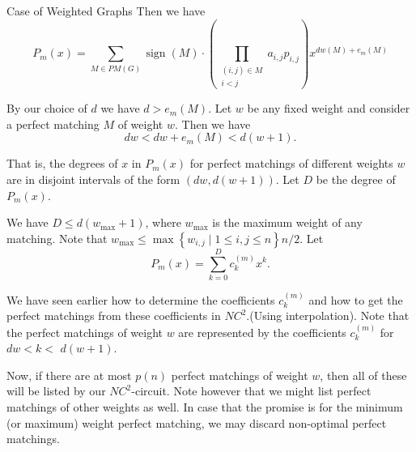 \documentclass{beamer}
\begin{document}
\begin{frame}[allowframebreaks]{Case of Weighted Graphs}
	Then we have
	$$
	P_m(x)=\sum_{M \in P M(G)} \operatorname{sign}(M) \cdot\left(\prod_{\substack{(i, j) \in M \\ i<j}} a_{i, j} p_{i, j}\right) x^{d w(M)+e_m(M)}
	$$
	
	By our choice of $d$ we have $d>e_m(M)$. Let $w$ be any fixed weight and consider a perfect matching $M$ of weight $w$. Then we have
	$$
	d w<d w+e_m(M)<d(w+1) .
	$$
	
	That is, the degrees of $x$ in $P_m(x)$ for perfect matchings of different weights $w$ are in disjoint intervals of the form $(d w, d(w+1))$. Let $D$ be the degree of $P_m(x)$.
	
	We have $D \leq d (w_{\max }+1)$, where $w_{\max }$ is the maximum weight of any matching. Note that $w_{\max } \leq \max \left\{w_{i, j} \mid 1 \leq i, j \leq n\right\} n / 2$. Let
	$$
	P_m(x)=\sum_{k=0}^D c_k^{(m)} x^k .
	$$
	
	We have seen earlier how to determine the coefficients $c_k^{(m)}$ and how to get the perfect matchings from these coefficients in $NC^2$.(Using interpolation). Note that the perfect matchings of weight $w$ are represented by the coefficients $c_k^{(m)}$ for $d w<k<$ $d(w+1)$.
	
	Now, if there are at most $p(n)$ perfect matchings of weight $w$, then all of these will be listed by our $NC^2$-circuit. Note however that we might list perfect matchings of other weights as well. In case that the promise is for the minimum (or maximum) weight perfect matching, we may discard non-optimal perfect matchings.
\end{frame}
\end{document}
